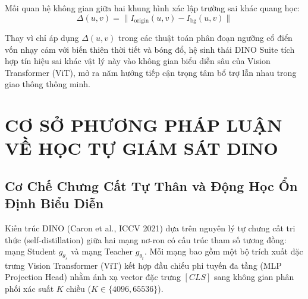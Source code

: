 \documentclass[11pt,a4paper]{article}
\begin{document}
Mối quan hệ không gian giữa hai khung hình xác lập trường sai khác quang học:
\begin{equation}
    \Delta(u, v) = \|I_{\text{origin}}(u, v) - I_{\text{bg}}(u, v)\|
\end{equation}

Thay vì chỉ áp dụng $\Delta(u, v)$ trong các thuật toán phân đoạn ngưỡng cổ điển vốn nhạy cảm với biến thiên thời tiết và bóng đổ, hệ sinh thái DINO Suite tích hợp tín hiệu sai khác vật lý này vào không gian biểu diễn sâu của Vision Transformer (ViT), mở ra năm hướng tiếp cận trọng tâm bổ trợ lẫn nhau trong giao thông thông minh.

\section{CƠ SỞ PHƯƠNG PHÁP LUẬN VỀ HỌC TỰ GIÁM SÁT DINO}

\subsection{Cơ Chế Chưng Cất Tự Thân và Động Học Ổn Định Biểu Diễn}
Kiến trúc DINO (Caron et al., ICCV 2021) dựa trên nguyên lý tự chưng cất tri thức (self-distillation) giữa hai mạng nơ-ron có cấu trúc tham số tương đồng: mạng Student $g_{\theta_s}$ và mạng Teacher $g_{\theta_t}$. Mỗi mạng bao gồm một bộ trích xuất đặc trưng Vision Transformer (ViT) kết hợp đầu chiếu phi tuyến đa tầng (MLP Projection Head) nhằm ánh xạ vector đặc trưng $[CLS]$ sang không gian phân phối xác suất $K$ chiều ($K \in \{4096, 65536\}$).
\end{document}

